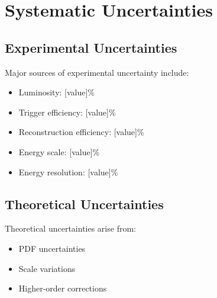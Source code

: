 \section{Systematic Uncertainties}
\label{sec:RESULTS_SYSTEMATIC_UNCERTAINTIES}

\subsection{Experimental Uncertainties}
\label{sec:RESULTS_SYSTEMATIC_UNCERTAINTIES_EXPERIMENTAL_UNCERTAINTIES}

Major sources of experimental uncertainty include:
\begin{itemize}
  \item Luminosity: [value]\%
  \item Trigger efficiency: [value]\%
  \item Reconstruction efficiency: [value]\%
  \item Energy scale: [value]\%
  \item Energy resolution: [value]\%
\end{itemize}

\subsection{Theoretical Uncertainties}
\label{sec:RESULTS_SYSTEMATIC_UNCERTAINTIES_THEORETICAL_UNCERTAINTIES}

Theoretical uncertainties arise from:
\begin{itemize}
  \item PDF uncertainties
  \item Scale variations
  \item Higher-order corrections
\end{itemize}

